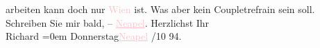                arbeiten kann doch nur \textcolor{pink}{Wien}{}\ledrightnote{\textcolor{pink}{Wien}} ist. Was aber kein
               Coupletrefrain sein soll. Schreiben Sie mir bald, – \textcolor{pink}{\uline{Neapel}}{}\ledrightnote{\textcolor{pink}{Neapel}}.\pend
           \pstart
           Herzlichst Ihr{\\[\baselineskip]}\spacefill\mbox{Richard}\pend
           \leftskip=0em{}\pstart
           Donnerstag\hspace*{1.5em}\textcolor{pink}{\uline{Neapel}}{}\ledrightnote{\textcolor{pink}{Neapel}}\pend
           /10 94.\pend
           \endnumbering{}  
      